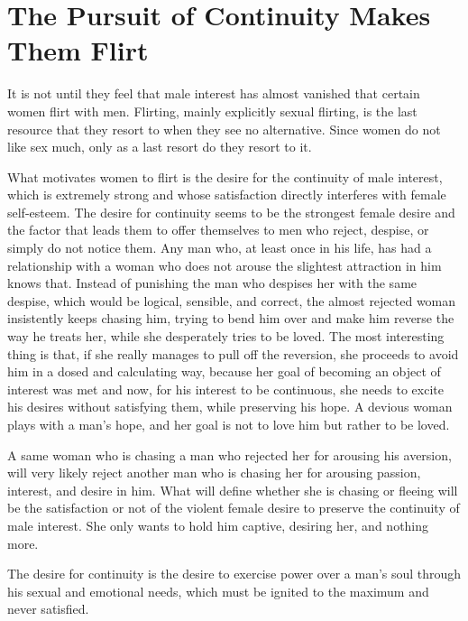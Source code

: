 \section{The Pursuit of Continuity Makes Them Flirt}

\par It is not until they feel that male interest has almost vanished that certain women flirt with men. Flirting, mainly explicitly sexual flirting, is the last resource that they resort to when they see no alternative. Since women do not like sex much, only as a last resort do they resort to it.

\par What motivates women to flirt is the desire for the continuity of male interest, which is extremely strong and whose satisfaction directly interferes with female self-esteem. The desire for continuity seems to be the strongest female desire and the factor that leads them to offer themselves to men who reject, despise, or simply do not notice them. Any man who, at least once in his life, has had a relationship with a woman who does not arouse the slightest attraction in him knows that. Instead of punishing the man who despises her with the same despise, which would be logical, sensible, and correct, the almost rejected woman insistently keeps chasing him, trying to bend him over and make him reverse the way he treats her, while she desperately tries to be loved. The most interesting thing is that, if she really manages to pull off the reversion, she proceeds to avoid him in a dosed and calculating way, because her goal of becoming an object of interest was met and now, for his interest to be continuous, she needs to excite his desires without satisfying them, while preserving his hope. A devious woman plays with a man's hope, and her goal is not to love him but rather to be loved.

\par A same woman who is chasing a man who rejected her for arousing his aversion, will very likely reject another man who is chasing her for arousing passion, interest, and desire in him. What will define whether she is chasing or fleeing will be the satisfaction or not of the violent female desire to preserve the continuity of male interest. She only wants to hold him captive, desiring her, and nothing more.

\par The desire for continuity is the desire to exercise power over a man's soul through his sexual and emotional needs, which must be ignited to the maximum and never satisfied.

